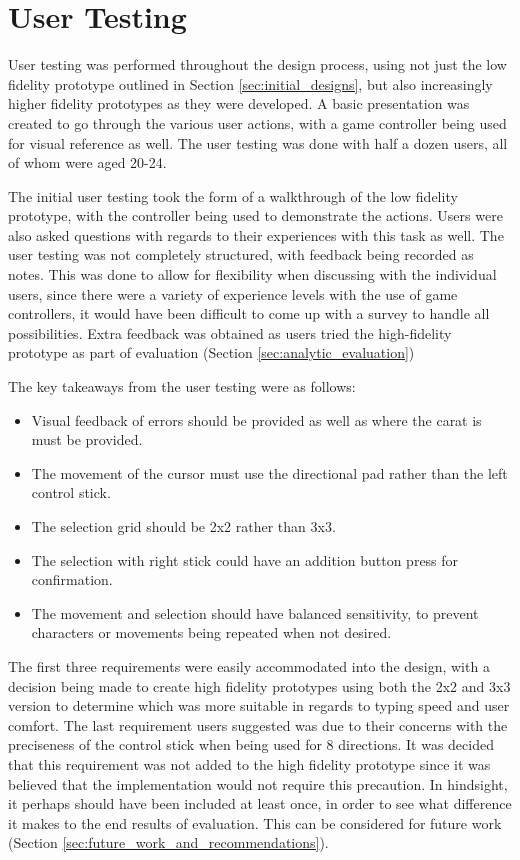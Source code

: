 \documentclass[testing.tex]{subfiles}
\begin{document}
\section{User Testing} %
\label{sec:user_testing}
User testing was performed throughout the design process, using not just the
low fidelity prototype outlined in Section \ref{sec:initial_designs}, but also
increasingly higher fidelity prototypes as they were developed. A basic
presentation was created to go through the various user actions, with a game
controller being used for visual reference as well. The user testing was done
with half a dozen users, all of whom were aged 20-24.

The initial user testing took the form of a walkthrough of the low fidelity
prototype, with the controller being used to demonstrate the actions. Users
were also asked questions with regards to their experiences with this task as
well. The user testing was not completely structured, with feedback being
recorded as notes. This was done to allow for flexibility when discussing with
the individual users, since there were a variety of experience levels with the
use of game controllers, it would have been difficult to come up with a survey
to handle all possibilities. Extra feedback was obtained as users tried the
high-fidelity prototype as part of evaluation (Section
\ref{sec:analytic_evaluation})

The key takeaways from the user testing were as follows:

\begin{itemize}
	\item Visual feedback of errors should be provided as well as where the
    carat is must be provided.
	\item The movement of the cursor must use the directional pad rather than
	the left control stick.
	\item The selection grid should be 2x2 rather than 3x3.
	\item The selection with right stick could have an addition button press for
	confirmation.
	\item The movement and selection should have balanced sensitivity, to
    prevent characters or movements being repeated when not desired.
\end{itemize}

The first three requirements were easily accommodated into the design, with a
decision being made to create high fidelity prototypes using both the 2x2 and
3x3 version to determine which was more suitable in regards to typing speed and
user comfort. The last requirement users suggested was due to their concerns
with the preciseness of the control stick when being used for 8 directions. It
was decided that this requirement was not added to the high fidelity prototype
since it was believed that the implementation would not require this precaution.
In hindsight, it perhaps should have been included at least once, in order to 
see what difference it makes to the end results of evaluation. This can be
considered for future work (Section \ref{sec:future_work_and_recommendations}).
\end{document}
